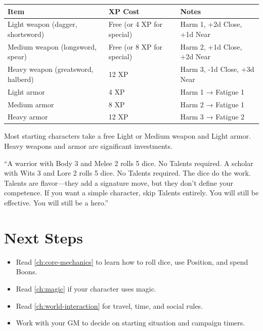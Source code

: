 \begin{center}
\footnotesize
\begin{tabular}{lll}
\toprule
\textbf{Item} & \textbf{XP Cost} & \textbf{Notes} \\
\midrule
Light weapon (dagger, shortsword) & Free (or 4 XP for special) & Harm 1, +2d Close, +1d Near \\
Medium weapon (longsword, spear) & Free (or 8 XP for special) & Harm 2, +1d Close, +2d Near \\
Heavy weapon (greatsword, halberd) & 12 XP & Harm 3, -1d Close, +3d Near \\
Light armor & 4 XP & Harm 1 → Fatigue 1 \\
Medium armor & 8 XP & Harm 2 → Fatigue 1 \\
Heavy armor & 12 XP & Harm 3 → Fatigue 2 \\
\bottomrule
\end{tabular}
\end{center}

Most starting characters take a free Light or Medium weapon and Light armor. Heavy weapons and armor are significant investments.

\begin{tcolorbox}[colback=green!5!white,colframe=green!70!black,title=The Gray Wanderer's Advice,breakable]
``A warrior with Body 3 and Melee 2 rolls 5 dice. No Talents required. A scholar with Wits 3 and Lore 2 rolls 5 dice. No Talents required. The dice do the work. Talents are flavor---they add a signature move, but they don't define your competence. If you want a simple character, skip Talents entirely. You will still be effective. You will still be a hero.''
\end{tcolorbox}

\section{Next Steps}
\begin{itemize}
  \item Read \ref{ch:core-mechanics} to learn how to roll dice, use Position, and spend Boons.
  \item Read \ref{ch:magic} if your character uses magic.
  \item Read \ref{ch:world-interaction} for travel, time, and social rules.
  \item Work with your GM to decide on starting situation and campaign timers.
\end{itemize}

